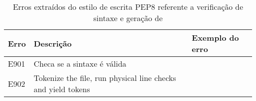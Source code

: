 	\begin{table}
		\scriptsize
		\begin{tabularx}{\linewidth}{ |l|X|X| }
			\hline
			\textbf{Erro}
			& \textbf{Descrição}
			& \textbf{Exemplo do erro} \\
			\hline
			E901 
			& Checa se a sintaxe é válida 
			&  \\
			\hline
			E902 
			& Tokenize the file, run physical line checks and yield tokens 
			&  \\
			\hline
		\end{tabularx}
		\caption{Erros extraídos do estilo de escrita PEP8 referente a verificação de sintaxe e geração de }
		\label{tab:pep8E900}
	\end{table}